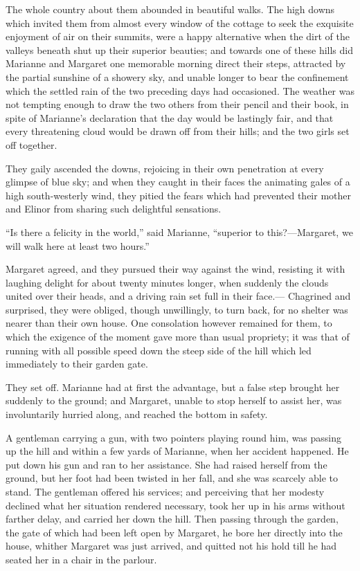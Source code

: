 The whole country about them abounded in beautiful walks.
The high downs which invited them from almost every window
of the cottage to seek the exquisite enjoyment of air
on their summits, were a happy alternative when the dirt
of the valleys beneath shut up their superior beauties;
and towards one of these hills did Marianne and Margaret
one memorable morning direct their steps, attracted by the
partial sunshine of a showery sky, and unable longer to bear
the confinement which the settled rain of the two preceding
days had occasioned.  The weather was not tempting enough
to draw the two others from their pencil and their book,
in spite of Marianne's declaration that the day would
be lastingly fair, and that every threatening cloud would
be drawn off from their hills; and the two girls set off
together.

They gaily ascended the downs, rejoicing in their own
penetration at every glimpse of blue sky; and when they
caught in their faces the animating gales of a high
south-westerly wind, they pitied the fears which had prevented
their mother and Elinor from sharing such delightful sensations.

``Is there a felicity in the world,'' said Marianne,
``superior to this?---Margaret, we will walk here at least
two hours.''

Margaret agreed, and they pursued their way against
the wind, resisting it with laughing delight for about
twenty minutes longer, when suddenly the clouds united over
their heads, and a driving rain set full in their face.---%
Chagrined and surprised, they were obliged, though unwillingly,
to turn back, for no shelter was nearer than their own house.
One consolation however remained for them, to which the
exigence of the moment gave more than usual propriety;
it was that of running with all possible speed down the steep
side of the hill which led immediately to their garden gate.

They set off.  Marianne had at first the advantage,
but a false step brought her suddenly to the ground;
and Margaret, unable to stop herself to assist her,
was involuntarily hurried along, and reached the bottom
in safety.

A gentleman carrying a gun, with two pointers
playing round him, was passing up the hill and within
a few yards of Marianne, when her accident happened.
He put down his gun and ran to her assistance.  She had
raised herself from the ground, but her foot had been
twisted in her fall, and she was scarcely able to stand.
The gentleman offered his services; and perceiving that her
modesty declined what her situation rendered necessary,
took her up in his arms without farther delay, and carried
her down the hill.  Then passing through the garden,
the gate of which had been left open by Margaret, he bore her
directly into the house, whither Margaret was just arrived,
and quitted not his hold till he had seated her in a chair
in the parlour.

